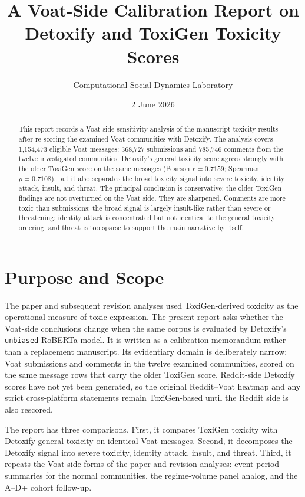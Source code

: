 \documentclass[11pt,letterpaper]{article}
\title{A Voat-Side Calibration Report on Detoxify and ToxiGen Toxicity Scores}
\author{Computational Social Dynamics Laboratory}
\date{2 June 2026}
\begin{document}
\maketitle

\begin{abstract}
This report records a Voat-side sensitivity analysis of the manuscript toxicity results after re-scoring the examined Voat communities with Detoxify.  The analysis covers 1,154,473 eligible Voat messages: 368,727 submissions and 785,746 comments from the twelve investigated communities.  Detoxify's general toxicity score agrees strongly with the older ToxiGen score on the same messages (Pearson $r=0.7159$; Spearman $\rho=0.7108$), but it also separates the broad toxicity signal into severe toxicity, identity attack, insult, and threat.  The principal conclusion is conservative: the older ToxiGen findings are not overturned on the Voat side.  They are sharpened.  Comments are more toxic than submissions; the broad signal is largely insult-like rather than severe or threatening; identity attack is concentrated but not identical to the general toxicity ordering; and threat is too sparse to support the main narrative by itself.
\end{abstract}

\section{Purpose and Scope}
The paper and subsequent revision analyses used ToxiGen-derived toxicity as the operational measure of toxic expression.  The present report asks whether the Voat-side conclusions change when the same corpus is evaluated by Detoxify's \texttt{unbiased} RoBERTa model.  It is written as a calibration memorandum rather than a replacement manuscript.  Its evidentiary domain is deliberately narrow: Voat submissions and comments in the twelve examined communities, scored on the same message rows that carry the older ToxiGen score.  Reddit-side Detoxify scores have not yet been generated, so the original Reddit--Voat heatmap and any strict cross-platform statements remain ToxiGen-based until the Reddit side is also rescored.

The report has three comparisons.  First, it compares ToxiGen toxicity with Detoxify general toxicity on identical Voat messages.  Second, it decomposes the Detoxify signal into severe toxicity, identity attack, insult, and threat.  Third, it repeats the Voat-side forms of the paper and revision analyses: event-period summaries for the normal communities, the regime-volume panel analog, and the A--D+ cohort follow-up.
\end{document}
